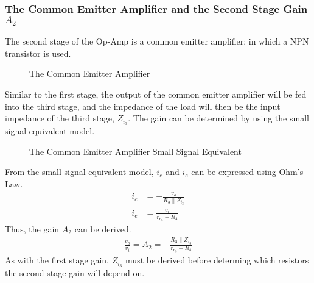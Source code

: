 \documentclass[lettersize,journal]{IEEEtran}
\begin{document}
\subsubsection{The Common Emitter Amplifier and the Second Stage Gain $A_2$}
The second stage of the Op-Amp is a common emitter amplifier; in which a NPN 
transistor is used.
\begin{figure}[H]
  \centering
  \caption{The Common Emitter Amplifier}
  \label{fig:commonemitter}
\end{figure}
Similar to the first stage, the output of the common emitter amplifier will be 
fed into the third stage, and the impedance of the load will then be the input 
impedance of the third stage, $Z_{i_3}$. The gain can be determined by using 
the small signal equivalent model.

\IEEEpubidadjcol
\begin{figure}[H]
  \centering
  \caption{The Common Emitter Amplifier Small Signal Equivalent}
  \label{fig:commonemittersmallsignal}
\end{figure}

From the small signal equivalent model, $i_e$ and $i_e$ can be expressed using 
Ohm's Law.
\begin{align}
\label{eq:analysis2_1}
i_c &= -\frac{v_o}{R_3 \parallel Z_{i_3}} \\[1.5ex]
i_e &= \frac{v_i}{r_{e_5} + R_4}
\end{align}
Thus, the gain $A_2$ can be derived.
\begin{align}
\label{gainA2}
\frac{v_o}{v_i} = A_2 = -\frac{R_3 \parallel Z_{i_3}}{r_{e_5} + R_4}
\end{align}
As with the first stage gain, $Z_{i_3}$ must be derived before determing which 
resistors the second stage gain will depend on.
\end{document}
